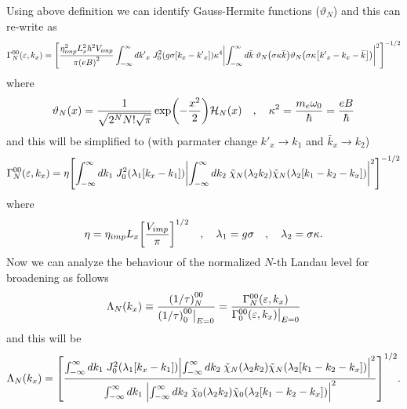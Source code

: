 \noindent
Using above definition we can identify Gauss-Hermite functions ($\vartheta_N$) and this can re-write as
\begin{equation} \label{5.11}
  \begin{aligned}
    \Gamma^{00}_{N}(\varepsilon,k_x)  =
    \qty[
    \frac { \eta_{imp}^2 L_x^2 \hbar^2 V_{imp}}{\pi\qty(eB)^2}
    \int_{-\infty}^{\infty} d {k'}_x \;
    J_0^2\qty(g\sigma[{k}_x - {k'}_x])
    \kappa^4
    \qty|
    \int_{-\infty}^{\infty} d\bar{k} \;
    \vartheta_{N}\qty(\sigma\kappa\bar{k})
    \vartheta_{N}\qty(\sigma\kappa\qty[{k'}_x - {k}_x - \bar{k}])|^2
    ]^{-1/2}
  \end{aligned}
\end{equation}
where
\begin{equation} \label{5.12}
  \vartheta_N(x) = \frac{1}{\sqrt{2^{N}N!\sqrt{\pi}}}
  \exp(-\frac{x^2}{2})
  \mathcal{H}_N\qty(x) \quad,\quad
  \kappa^2 = \frac{m_e\omega_0}{\hbar} = \frac{eB}{\hbar}
\end{equation}
and this will be simplified to (with parmater change $k'_x \rightarrow k_1$ and $\bar{k}_x \rightarrow k_2$)
\begin{equation} \label{5.13}
  \begin{aligned}
    \Gamma^{00}_{N}(\varepsilon,k_x)  =
    \eta
    \qty[
    \int_{-\infty}^{\infty} d {k}_1 \;
    J_0^2\qty(\lambda_1[{k}_x - {k}_1])
    \qty|
    \int_{-\infty}^{\infty} d{k}_2 \;
    \tilde{\chi}_{N}\qty(\lambda_2 k_2)
    \tilde{\chi}_{N}\qty(\lambda_2 \qty[{k}_1 - {k}_2 - {k}_x])|^2
    ]^{-1/2}
  \end{aligned}
\end{equation}
where
\begin{equation} \label{5.14}
    \eta = \eta_{imp} L_x \qty[\frac { V_{imp}}{\pi}]^{1/2} \quad,\quad
    \lambda_1 = g\sigma \quad,\quad
    \lambda_2 = \sigma \kappa.
\end{equation}
\noindent
Now we can analyze the behaviour of the normalized $N$-th Landau level for broadening as follows
\begin{equation} \label{5.15}
    \Lambda_N(k_x) \equiv
    \frac{\qty(1/\tau)^{00}_{N}}{\qty(1/\tau)^{00}_{0}\big|_{E=0}} =
    \frac{\Gamma^{00}_{N}(\varepsilon,k_x)}{\Gamma^{00}_{0}(\varepsilon,k_x)\big|_{E=0}}
\end{equation}
and this will be
\begin{equation} \label{5.16}
    \Lambda_N (k_x) =
    \qty[
    \frac
    {\int_{-\infty}^{\infty} d {k}_1 \;
    J_0^2\qty(\lambda_1[{k}_x - {k}_1])
    \qty|
    \int_{-\infty}^{\infty} d{k}_2 \;
    \tilde{\chi}_{N}\qty(\lambda_2 k_2)
    \tilde{\chi}_{N}\qty(\lambda_2 \qty[{k}_1 - {k}_2 - {k}_x])|^2}
    {\int_{-\infty}^{\infty} d {k}_1 \;
    \qty|
    \int_{-\infty}^{\infty} d{k}_2 \;
    \tilde{\chi}_{0}\qty(\lambda_2 k_2)
    \tilde{\chi}_{0}\qty(\lambda_2 \qty[{k}_1 - {k}_2 - {k}_x])|^2}
    ]^{1/2}.
\end{equation}

